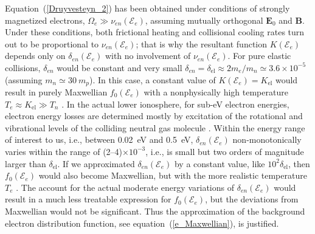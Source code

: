 \documentclass[draft]{agujournal2019}
\renewcommand{\vec}{\mathbf}
\begin{document}
Equation~(\ref{Druyvesteyn_2}) has been obtained under conditions of strongly
magnetized electrons, $\Omega_{e}\gg\nu_{en}(\mathcal{E}_{e})$,  assuming mutually
orthogonal $\vec{E}_{0}$ and $\vec{B}$. Under these conditions,
both frictional heating and collisional cooling rates turn out to be
proportional to $\nu_{en}(\mathcal{E}_{e})$; that is why the resultant
function $K(\mathcal{E}_{e})$ depends only on $\delta_{en}(\mathcal{E}_{e})$
with no involvement of $\nu_{en}(\mathcal{E}_{e})$. For pure elastic
collisions, $\delta_{en}$ would be constant and very small $\delta_{en}
=\delta_{\mathrm{el}}\approx 2m_{e}/m_{n}\simeq3.6\times10^{-5}$ (assuming
$m_{n}\simeq30~m_{p}$). In this case, a constant value of $K(\mathcal{E}
_{e})=K_{\mathrm{el}}$ would result in purely Maxwellian $f_{0}(\mathcal{E}
_{e})$ with a nonphysically high temperature $T_{e}\approx K_{\mathrm{el}}
\gg T_{n}$ \cite{Dimant:Effects22}. In the actual lower ionosphere, for sub-eV
electron energies, electron energy losses are determined mostly by
excitation of the rotational and vibrational levels of the colliding neutral
gas molecule \cite{Gurevich:Nonlinear78}. Within the energy range of interest to us, i.e., between
0.02~eV and 0.5~eV, $\delta_{en}(\mathcal{E}_{e})$ non-monotonically varies within the range of
(2--4)$\times10^{-3}$, i.e., is small but two orders of magnitude larger
than $\delta_{\mathrm{el}}$. If we approximated $\delta_{en}(\mathcal{E}_{e})$
by a constant value, like $10^{2}\delta_{\mathrm{el}}$, then $f_{0}
(\mathcal{E}_{e})$ would also become Maxwellian, but with the more realistic
temperature $T_{e}$ \cite{Dimant:Unified23}. The account for the actual moderate 
energy variations of $\delta_{en}(\mathcal{E}_{e})$ would result in a much less treatable
expression for $f_{0}(\mathcal{E}_{e})$, but the deviations from Maxwellian
would not be significant. Thus the approximation of the background electron distribution function, 
see equation~(\ref{e_Maxwellian}), is justified.
\end{document}
